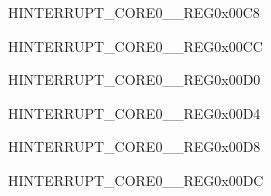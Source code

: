 \begin{register}{H}{INTERRUPT\_CORE0\_\_REG}{0x00C8}\label{regdesc:INTERRUPTCORE0CPUINTRFROMCPU0MAPREG}






\end{register}\vspace{-3em}


\begin{register}{H}{INTERRUPT\_CORE0\_\_REG}{0x00CC}\label{regdesc:INTERRUPTCORE0CPUINTRFROMCPU1MAPREG}






\end{register}\vspace{-3em}


\begin{register}{H}{INTERRUPT\_CORE0\_\_REG}{0x00D0}\label{regdesc:INTERRUPTCORE0CPUINTRFROMCPU2MAPREG}






\end{register}\vspace{-3em}


\begin{register}{H}{INTERRUPT\_CORE0\_\_REG}{0x00D4}\label{regdesc:INTERRUPTCORE0CPUINTRFROMCPU3MAPREG}






\end{register}\vspace{-3em}


\begin{register}{H}{INTERRUPT\_CORE0\_\_REG}{0x00D8}\label{regdesc:INTERRUPTCORE0ASSISTDEBUGINTRMAPREG}






\end{register}\vspace{-3em}


\begin{register}{H}{INTERRUPT\_CORE0\_\_REG}{0x00DC}\label{regdesc:INTERRUPTCORE0DMAAPBPERIPMSMONITORVIOLATEINTRMAPREG}






\end{register}\vspace{-3em}


